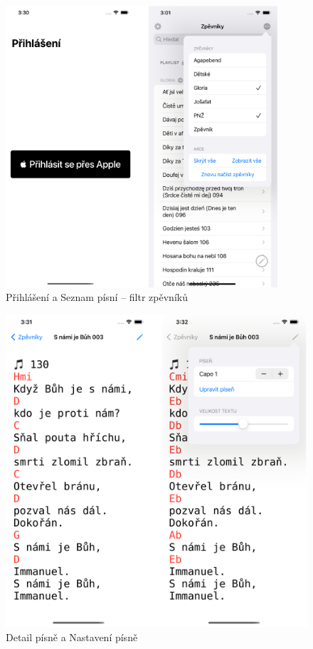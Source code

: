 \begin{figure}[H]
    \includegraphics[width=0.9\textwidth]{images/C-ui/C-1-prihlaseni-seznam-zpevniku.png}
    \caption{Přihlášení a Seznam písní -- filtr zpěvníků}
\end{figure}


\begin{figure}
    \includegraphics[width=\textwidth]{images/C-ui/C-2-detail-pisne.png}
    \caption{Detail písně a Nastavení písně}
\end{figure}

